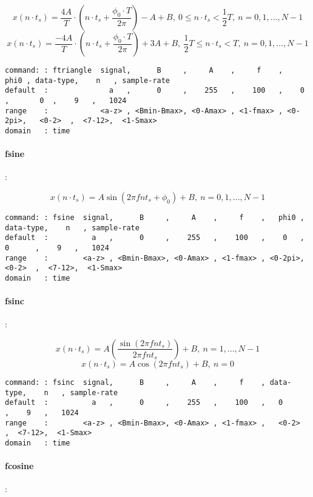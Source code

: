 \documentclass{report}
\newcommand{\bc}{\scriptsize}
\newcommand{\ec}{\normalsize}
\begin{document}
\[ x(n \cdot t_{s}) = \frac{4A}{T}\cdot(n \cdot t_{s} + \frac{\phi_{0} \cdot T}{2\pi})-A+B,~ 0 \leq n \cdot t_{s} < \frac{1}{2}T,~ n=0,1,...,N-1 \]
\[ x(n \cdot t_{s}) = \frac{-4A}{T}\cdot(n \cdot t_{s} + \frac{\phi_{0} \cdot T}{2\pi})+3A+B,~ \frac{1}{2}T \leq n \cdot t_{s} < T,~ n=0,1,...,N-1 \]

\bc
\begin{verbatim}
command: : ftriangle  signal,      B     ,     A    ,     f    ,   phi0 , data-type,    n   , sample-rate
default  :              a   ,      0     ,    255   ,    100   ,    0   ,       0  ,    9   ,   1024
range    :            <a-z> , <Bmin-Bmax>, <0-Amax> , <1-fmax> , <0-2pi>,   <0-2>  ,  <7-12>,  <1-Smax>
domain   : time
\end{verbatim}
\ec

\paragraph{fsine}:

\[ x(n \cdot t_{s}) = A \sin(2\pi fnt_{s} + \phi_{0}) + B,~ n=0,1,...,N-1 \]

\bc
\begin{verbatim}
command: : fsine  signal,      B     ,     A    ,     f    ,   phi0 , data-type,    n   , sample-rate
default  :          a   ,      0     ,    255   ,    100   ,    0   ,   0      ,    9   ,   1024
range    :        <a-z> , <Bmin-Bmax>, <0-Amax> , <1-fmax> , <0-2pi>,   <0-2>  ,  <7-12>,  <1-Smax>
domain   : time
\end{verbatim}
\ec

\paragraph{fsinc}:

\[ x(n \cdot t_{s}) = A \left( \frac{\sin (2\pi fnt_{s})}{2\pi fnt_{s}} \right) + B,~ n=1,...,N-1 \]
\[ x(n \cdot t_{s}) = A \cos (2\pi fnt_{s})+B,~ n=0 \]

\bc
\begin{verbatim}
command: : fsinc  signal,      B     ,     A    ,     f    , data-type,    n   , sample-rate
default  :          a   ,      0     ,    255   ,    100   ,   0      ,    9   ,   1024
range    :        <a-z> , <Bmin-Bmax>, <0-Amax> , <1-fmax> ,   <0-2>  ,  <7-12>,  <1-Smax>
domain   : time
\end{verbatim}
\ec

\paragraph{fcosine}:
\end{document}
